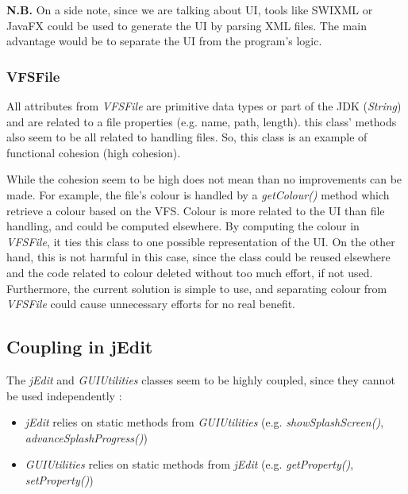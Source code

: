 \begin{framehint2}
    \textbf{N.B.} On a side note, since we are talking about UI, tools like
    SWIXML or JavaFX could be used to generate the UI by parsing XML files.
    The main advantage would be to separate the UI from the program's logic.
\end{framehint2}

\subsubsection{VFSFile}

All attributes from \emph{VFSFile} are primitive data types or part of
the JDK (\emph{String}) and are related to a file properties (e.g. name, path,
length). this class' methods also seem to be all related to handling files.
So, this class is an example of functional cohesion (high cohesion).

\begin{framewarning}
    While the cohesion seem to be high does not mean than no improvements can
    be made.
    For example, the file's colour is handled by a \emph{getColour()} method which
    retrieve a colour based on the VFS. Colour is more related to the UI than
    file handling, and could be computed elsewhere.
    By computing the colour in \emph{VFSFile}, it ties this class to one
    possible representation of the UI. On the other hand, this is not harmful in
    this case, since the class could be reused elsewhere and the code related to
    colour deleted without too much effort, if not used. Furthermore, the
    current solution is simple to use, and separating colour from
    \emph{VFSFile} could cause unnecessary efforts for no real benefit.
\end{framewarning}

\subsection{Coupling in jEdit}

The \emph{jEdit} and \emph{GUIUtilities} classes seem to be highly
coupled, since they cannot be used independently :

\begin{itemize}\itemsep1pt
    \item \emph{jEdit} relies on static methods from \emph{GUIUtilities} (e.g.
    \emph{showSplashScreen()}, \emph{advanceSplashProgress()})

    \item \emph{GUIUtilities} relies on static methods from \emph{jEdit} (e.g.
    \emph{getProperty()}, \emph{setProperty()})
\end{itemize}

